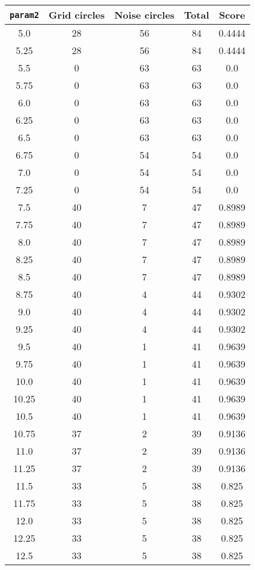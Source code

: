 \documentclass[letterpaper, 12pt]{article}
\begin{document}
\begin{longtable}{|c|c|c|c|c|}
\hline
\textbf{\texttt{param2}} & \textbf{Grid circles} & \textbf{Noise circles} & \textbf{Total} & \textbf{Score} \\
\hline
5.0 & 28 & 56 & 84 & 0.4444 \\
\hline
5.25 & 28 & 56 & 84 & 0.4444 \\
\hline
5.5 & 0 & 63 & 63 & 0.0 \\
\hline
5.75 & 0 & 63 & 63 & 0.0 \\
\hline
6.0 & 0 & 63 & 63 & 0.0 \\
\hline
6.25 & 0 & 63 & 63 & 0.0 \\
\hline
6.5 & 0 & 63 & 63 & 0.0 \\
\hline
6.75 & 0 & 54 & 54 & 0.0 \\
\hline
7.0 & 0 & 54 & 54 & 0.0 \\
\hline
7.25 & 0 & 54 & 54 & 0.0 \\
\hline
7.5 & 40 & 7 & 47 & 0.8989 \\
\hline
7.75 & 40 & 7 & 47 & 0.8989 \\
\hline
8.0 & 40 & 7 & 47 & 0.8989 \\
\hline
8.25 & 40 & 7 & 47 & 0.8989 \\
\hline
8.5 & 40 & 7 & 47 & 0.8989 \\
\hline
8.75 & 40 & 4 & 44 & 0.9302 \\
\hline
9.0 & 40 & 4 & 44 & 0.9302 \\
\hline
9.25 & 40 & 4 & 44 & 0.9302 \\
\hline
9.5 & 40 & 1 & 41 & 0.9639 \\
\hline
9.75 & 40 & 1 & 41 & 0.9639 \\
\hline
10.0 & 40 & 1 & 41 & 0.9639 \\
\hline
10.25 & 40 & 1 & 41 & 0.9639 \\
\hline
10.5 & 40 & 1 & 41 & 0.9639 \\
\hline
10.75 & 37 & 2 & 39 & 0.9136 \\
\hline
11.0 & 37 & 2 & 39 & 0.9136 \\
\hline
11.25 & 37 & 2 & 39 & 0.9136 \\
\hline
11.5 & 33 & 5 & 38 & 0.825 \\
\hline
11.75 & 33 & 5 & 38 & 0.825 \\
\hline
12.0 & 33 & 5 & 38 & 0.825 \\
\hline
12.25 & 33 & 5 & 38 & 0.825 \\
\hline
12.5 & 33 & 5 & 38 & 0.825 \\

\end{longtable}
\end{document}
